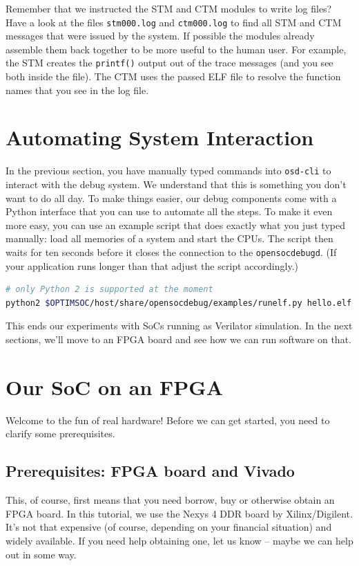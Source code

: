 Remember that we instructed the STM and CTM modules to write log files?
Have a look at the files \verb|stm000.log| and \verb|ctm000.log| to find all STM and CTM messages that were issued by the system.
If possible the modules already assemble them back together to be more useful to the human user.
For example, the STM creates the \verb|printf()| output out of the trace messages (and you see both inside the file).
The CTM uses the passed ELF file to resolve the function names that you see in the log file.

\section{Automating System Interaction}
In the previous section, you have manually typed commands into \verb|osd-cli| to interact with the debug system.
We understand that this is something you don't want to do all day.
To make things easier, our debug components come with a Python interface that you can use to automate all the steps.
To make it even more easy, you can use an example script that does exactly what you just typed manually: load all memories of a system and start the CPUs.
The script then waits for ten seconds before it closes the connection to the \verb|opensocdebugd|.
(If your application runs longer than that adjust the script accordingly.)

\begin{lstlisting}[language=sh]
# only Python 2 is supported at the moment
python2 $OPTIMSOC/host/share/opensocdebug/examples/runelf.py hello.elf
\end{lstlisting}

This ends our experiments with SoCs running as Verilator simulation.
In the next sections, we'll move to an FPGA board and see how we can run software on that.

\section{Our SoC on an FPGA}
Welcome to the fun of real hardware!
Before we can get started, you need to clarify some prerequisites.

\subsection{Prerequisites: FPGA board and Vivado}
This, of course, first means that you need borrow, buy or otherwise obtain an FPGA board.
In this tutorial, we use the Nexys 4 DDR board by Xilinx/Digilent.
It's not that expensive (of course, depending on your financial situation) and widely available.
If you need help obtaining one, let us know -- maybe we can help out in some way.

